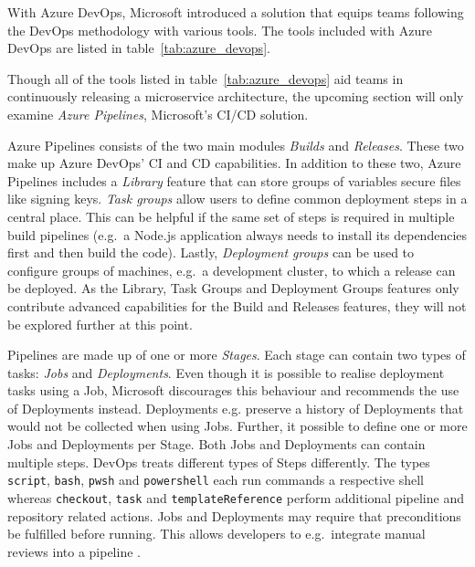 With Azure DevOps, Microsoft introduced a solution that equips teams following
the DevOps methodology with various tools. The tools included with Azure DevOps
are listed in table~\ref{tab:azure_devops}.


Though all of the tools listed in table~\ref{tab:azure_devops} aid teams in
continuously releasing a microservice architecture, the upcoming section will
only examine \textit{Azure Pipelines}, Microsoft's \ac{CI}/\ac{CD} solution. 

Azure Pipelines consists of the two main modules \textit{Builds} and
\textit{Releases}. These two make up Azure DevOps' \ac{CI} and \ac{CD}
capabilities. In addition to these two, Azure Pipelines includes a
\textit{Library} feature that can store groups of variables secure files like
signing keys. \textit{Task groups} allow users to define common deployment
steps in a central place. This can be helpful if the same set of steps is
required in multiple build pipelines (e.g.\ a Node.js application always needs
to install its dependencies first and then build the code). Lastly,
\textit{Deployment groups} can be used to configure groups of machines, e.g.\ a
development cluster, to which a release can be deployed. As the Library, Task
Groups and Deployment Groups features only contribute advanced capabilities for
the Build and Releases features, they will not be explored further at this
point.

Pipelines are made up of one or more \textit{Stages}. Each stage can contain
two types of tasks: \textit{Jobs} and \textit{Deployments}. Even though it is
possible to realise deployment tasks using a Job, Microsoft discourages this
behaviour and recommends the use of Deployments instead. Deployments e.g.
preserve a history of Deployments that would not be collected when using Jobs.
Further, it possible to define one or more Jobs and Deployments per Stage. Both
Jobs and Deployments can contain multiple steps. DevOps treats different types
of Steps differently. The types \texttt{script}, \texttt{bash}, \texttt{pwsh}
and \texttt{powershell} each run commands a respective shell whereas
\texttt{checkout}, \texttt{task} and \texttt{templateReference} perform
additional pipeline and repository related actions. Jobs and Deployments may
require that preconditions be fulfilled before running. This allows developers
to e.g.\ integrate manual reviews into a pipeline \autocite{MicrosoftJobs2019}.

